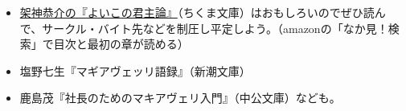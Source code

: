 \documentclass[autodetect-engine,dvipdfmx-if-dvi,ja=standard]{bxjsarticle} \usepackage{mystyle}
\begin{document}
\begin{itemize}
\item \href{https://amzn.to/2JWukdy}{架神恭介の『よいこの君主論』}（ちくま文庫）はおもしろいのでぜひ読んで、サークル・バイト先などを制圧し平定しよう。（amazonの「なか見！検索」で目次と最初の章が読める）
\item 塩野七生『マギアヴェッリ語録』（新潮文庫）
\item 鹿島茂『社長のためのマキアヴェリ入門』（中公文庫）なども。
\end{itemize}


\nocite{マキアヴェリ01:君主論,マキアヴェッリ98:君主論,佐々木毅94マキアヴェッリ,machiavelli1513:_il_princ}

\nocite{架神09よいこの君主論}

\ifx\mybook\undefined
{}


\end{document}
